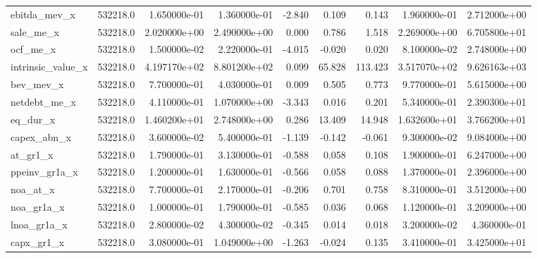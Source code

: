 \documentclass[12pt]{article}
\begin{document}
{\begin{landscape}
\begin{longtable}{|l|r|r|r|r|r|r|r|r|}
ebitda\_mev\_x           &  532218.0 &  1.650000e-01 &  1.360000e-01 &      -2.840 &        0.109 &        0.143 &  1.960000e-01 &  2.712000e+00 \\
sale\_me\_x              &  532218.0 &  2.020000e+00 &  2.490000e+00 &       0.000 &        0.786 &        1.518 &  2.269000e+00 &  6.705800e+01 \\
ocf\_me\_x               &  532218.0 &  1.500000e-02 &  2.220000e-01 &      -4.015 &       -0.020 &        0.020 &  8.100000e-02 &  2.748000e+00 \\
intrinsic\_value\_x      &  532218.0 &  4.197170e+02 &  8.801200e+02 &       0.099 &       65.828 &      113.423 &  3.517070e+02 &  9.626163e+03 \\
bev\_mev\_x              &  532218.0 &  7.700000e-01 &  4.030000e-01 &       0.009 &        0.505 &        0.773 &  9.770000e-01 &  5.615000e+00 \\
netdebt\_me\_x           &  532218.0 &  4.110000e-01 &  1.070000e+00 &      -3.343 &        0.016 &        0.201 &  5.340000e-01 &  2.390300e+01 \\
eq\_dur\_x               &  532218.0 &  1.460200e+01 &  2.748000e+00 &       0.286 &       13.409 &       14.948 &  1.632600e+01 &  3.766200e+01 \\
capex\_abn\_x            &  532218.0 &  3.600000e-02 &  5.400000e-01 &      -1.139 &       -0.142 &       -0.061 &  9.300000e-02 &  9.084000e+00 \\
at\_gr1\_x               &  532218.0 &  1.790000e-01 &  3.130000e-01 &      -0.588 &        0.058 &        0.108 &  1.900000e-01 &  6.247000e+00 \\
ppeinv\_gr1a\_x          &  532218.0 &  1.200000e-01 &  1.630000e-01 &      -0.566 &        0.058 &        0.088 &  1.370000e-01 &  2.396000e+00 \\
noa\_at\_x               &  532218.0 &  7.700000e-01 &  2.170000e-01 &      -0.206 &        0.701 &        0.758 &  8.310000e-01 &  3.512000e+00 \\
noa\_gr1a\_x             &  532218.0 &  1.000000e-01 &  1.790000e-01 &      -0.585 &        0.036 &        0.068 &  1.120000e-01 &  3.209000e+00 \\
lnoa\_gr1a\_x            &  532218.0 &  2.800000e-02 &  4.300000e-02 &      -0.345 &        0.014 &        0.018 &  3.200000e-02 &  4.360000e-01 \\
capx\_gr1\_x             &  532218.0 &  3.080000e-01 &  1.049000e+00 &      -1.263 &       -0.024 &        0.135 &  3.410000e-01 &  3.425000e+01 \\

\end{longtable}
\end{landscape}}
\end{document}
